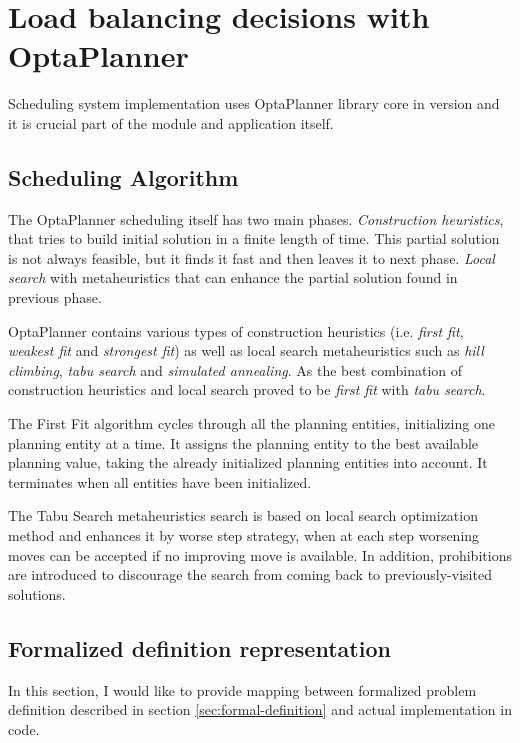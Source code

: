\section{Load balancing decisions with OptaPlanner}\label{sec:load-balancing-optaplanner}

Scheduling system implementation uses OptaPlanner library core in version \cite{optaplannerDoc}
and it is crucial part of the  module and application itself.

\subsection{Scheduling Algorithm}
The OptaPlanner scheduling itself has two main phases.
\textit{Construction heuristics}, that tries to build initial solution in a finite length of time.
This partial solution is not always feasible, 
but it finds it fast and then leaves it to next phase.
\textit{Local search} with metaheuristics that can enhance the partial solution found in previous phase.

OptaPlanner contains various types of construction heuristics (i.e. \textit{first fit}, \textit{weakest fit} and \textit{strongest fit})
as well as local search metaheuristics such as \textit{hill climbing}, \textit{tabu search} and \textit{simulated annealing}.
As the best combination of construction heuristics and local search proved to be \textit{first fit} with \textit{tabu search}.

The First Fit algorithm cycles through all the planning entities,
initializing one planning entity at a time. 
It assigns the planning entity to the best available planning value, 
taking the already initialized planning entities into account.
It terminates when all entities have been initialized\cite{optaplannerDoc:heuristics}.

The Tabu Search metaheuristics search is based on local search optimization method
and enhances it by worse step strategy, 
when at each step worsening moves can be accepted if no improving move is available.
In addition, prohibitions are introduced to discourage the search from coming back to previously-visited solutions\cite{glover1989tabu}.

\subsection{Formalized definition representation}
In this section,
I would like to provide mapping between formalized problem definition described in section \ref{sec:formal-definition}
and actual implementation in code.

